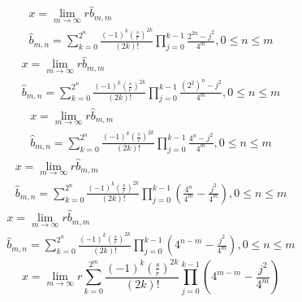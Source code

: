 \documentclass[a4paper,12pt]{report}
\begin{document}
\begin{subequations}
\begin{gather}
x = \lim \limits_{m \to \infty} r \hat{b}_{m,m} \\
\hat{b}_{m,n} = \sum \limits_{k=0}^{2^n} \frac{(-1)^k \left(\frac{s}{r}\right)^{2k}}{(2k)!} \prod \limits_{j=0}^{k-1} \frac{2^{2n} - j^2}{4^m}, 0 \leq n \leq m
\end{gather}
\end{subequations}
\begin{subequations}
\begin{gather}
x = \lim \limits_{m \to \infty} r \hat{b}_{m,m} \\
\hat{b}_{m,n} = \sum \limits_{k=0}^{2^n} \frac{(-1)^k \left(\frac{s}{r}\right)^{2k}}{(2k)!} \prod \limits_{j=0}^{k-1} \frac{(2^2)^n - j^2}{4^m}, 0 \leq n \leq m
\end{gather}
\end{subequations}
\begin{subequations}
\begin{gather}
x = \lim \limits_{m \to \infty} r \hat{b}_{m,m} \\
\hat{b}_{m,n} = \sum \limits_{k=0}^{2^n} \frac{(-1)^k \left(\frac{s}{r}\right)^{2k}}{(2k)!} \prod \limits_{j=0}^{k-1} \frac{4^n - j^2}{4^m}, 0 \leq n \leq m
\end{gather}
\end{subequations}
\begin{subequations}
\begin{gather}
x = \lim \limits_{m \to \infty} r \hat{b}_{m,m} \\
\hat{b}_{m,n} = \sum \limits_{k=0}^{2^n} \frac{(-1)^k \left(\frac{s}{r}\right)^{2k}}{(2k)!} \prod \limits_{j=0}^{k-1} \left(\frac{4^n}{4^m} - \frac{j^2}{4^m}\right), 0 \leq n \leq m
\end{gather}
\end{subequations}
\begin{subequations}
\begin{gather}
x = \lim \limits_{m \to \infty} r \hat{b}_{m,m} \\
\hat{b}_{m,n} = \sum \limits_{k=0}^{2^n} \frac{(-1)^k \left(\frac{s}{r}\right)^{2k}}{(2k)!} \prod \limits_{j=0}^{k-1} \left(4^{n-m} - \frac{j^2}{4^m}\right), 0 \leq n \leq m
\end{gather}
\end{subequations}
\begin{equation}
x = \lim \limits_{m \to \infty} r \sum \limits_{k=0}^{2^m} \frac{(-1)^k \left(\frac{s}{r}\right)^{2k}}{(2k)!} \prod \limits_{j=0}^{k-1} \left(4^{m-m} - \frac{j^2}{4^m}\right)
\end{equation}
\end{document}
